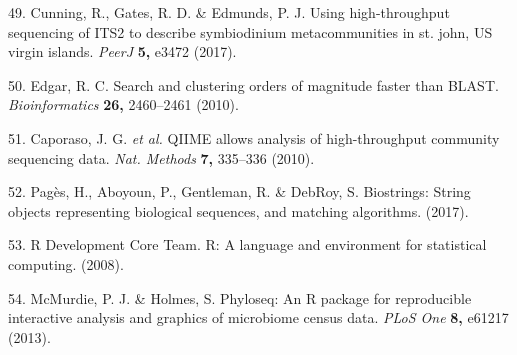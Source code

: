 \documentclass[]{article}
\begin{document}
\hypertarget{ref-Cunning2017-sc}{}
49. Cunning, R., Gates, R. D. \& Edmunds, P. J. Using high-throughput
sequencing of ITS2 to describe symbiodinium metacommunities in st. john,
US virgin islands. \emph{PeerJ} \textbf{5,} e3472 (2017).

\hypertarget{ref-Edgar2010-zl}{}
50. Edgar, R. C. Search and clustering orders of magnitude faster than
BLAST. \emph{Bioinformatics} \textbf{26,} 2460--2461 (2010).

\hypertarget{ref-Caporaso2010-yl}{}
51. Caporaso, J. G. \emph{et al.} QIIME allows analysis of
high-throughput community sequencing data. \emph{Nat. Methods}
\textbf{7,} 335--336 (2010).

\hypertarget{ref-Pages2017-ie}{}
52. Pagès, H., Aboyoun, P., Gentleman, R. \& DebRoy, S. Biostrings:
String objects representing biological sequences, and matching
algorithms. (2017).

\hypertarget{ref-R_Development_Core_Team2008-sp}{}
53. R Development Core Team. R: A language and environment for
statistical computing. (2008).

\hypertarget{ref-McMurdie2013-hf}{}
54. McMurdie, P. J. \& Holmes, S. Phyloseq: An R package for
reproducible interactive analysis and graphics of microbiome census
data. \emph{PLoS One} \textbf{8,} e61217 (2013).
\end{document}
